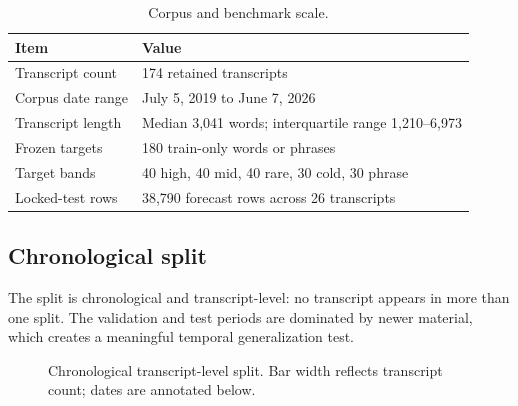 \documentclass[10pt,a4paper]{article}
\begin{document}
\begin{table}[H]
  \centering
  \caption{Corpus and benchmark scale.}
  \begin{tabularx}{\textwidth}{@{}L{44mm}Y@{}}
    \toprule
    \textbf{Item} & \textbf{Value}\\
    \midrule
    Transcript count & 174 retained transcripts\\
    Corpus date range & July 5, 2019 to June 7, 2026\\
    Transcript length & Median 3,041 words; interquartile range 1,210--6,973\\
    Frozen targets & 180 train-only words or phrases\\
    Target bands & 40 high, 40 mid, 40 rare, 30 cold, 30 phrase\\
    Locked-test rows & 38,790 forecast rows across 26 transcripts\\
    \bottomrule
  \end{tabularx}
\end{table}

\subsection{Chronological split}
The split is chronological and transcript-level: no transcript appears in more
than one split. The validation and test periods are dominated by newer material,
which creates a meaningful temporal generalization test.

\begin{figure}[H]
  \centering
  \caption{Chronological transcript-level split. Bar width reflects transcript count; dates are annotated below.}
\end{figure}
\end{document}
